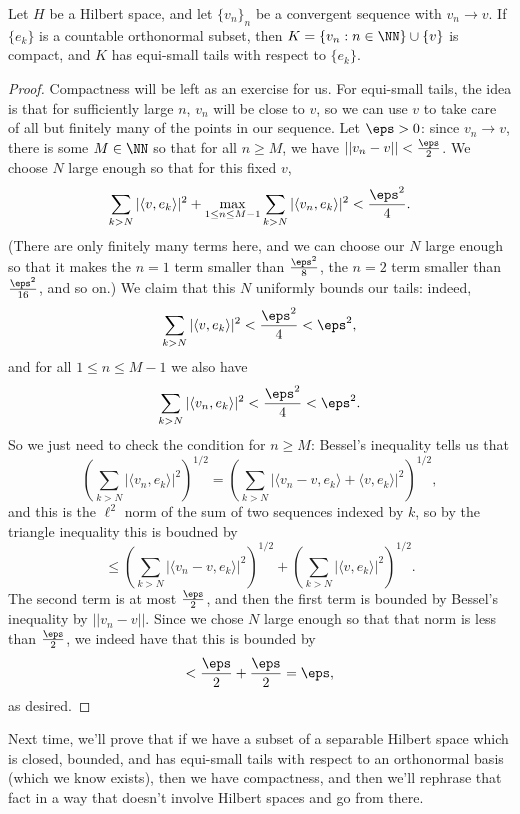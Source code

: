 \begin{theorem}
Let $H$ be a Hilbert space, and let $\{v_n\}_n$ be a convergent sequence with $v_n \to v$. If $\{e_k\}$ is a countable orthonormal subset, then $K = \{v_n: n \in \NN\} \cup \{v\}$ is compact, and $K$ has equi-small tails with respect to $\{e_k\}$.
\end{theorem}

\begin{proof}
Compactness will be left as an exercise for us. For equi-small tails, the idea is that for sufficiently large $n$, $v_n$ will be close to $v$, so we can use $v$ to take care of all but finitely many of the points in our sequence. Let $\eps > 0$: since $v_n \to v$, there is some $M \in \NN$ so that for all $n \ge M$, we have $||v_n - v|| < \frac{\eps}{2}$. We choose $N$ large enough so that for this fixed $v$,
\[
    \sum_{k > N} |\langle v, e_k \rangle|^2 + \max_{1 \le n \le M-1} \sum_{k > N}|\langle v_n, e_k \rangle|^2 < \frac{\eps^2}{4}.
\]
(There are only finitely many terms here, and we can choose our $N$ large enough so that it makes the $n = 1$ term smaller than $\frac{\eps^2}{8}$, the $n = 2$ term smaller than $\frac{\eps^2}{16}$, and so on.) We claim that this $N$ uniformly bounds our tails: indeed, 
\[
    \sum_{k > N} |\langle v, e_k \rangle|^2 < \frac{\eps^2}{4} < \eps^2,
\]
and for all $1 \le n \le M-1$ we also have
\[
    \sum_{k > N} |\langle v_n, e_k \rangle|^2 < \frac{\eps^2}{4} < \eps^2.
\]
So we just need to check the condition for $n \ge M$: Bessel's inequality tells us that
\[
    \left(\sum_{k > N} |\langle v_n, e_k \rangle|^2 \right)^{1/2} = \left(\sum_{k > N} |\langle v_n - v, e_k \rangle + \langle v, e_k \rangle|^2 \right)^{1/2},
\]
and this is the $\ell^2$ norm of the sum of two sequences indexed by $k$, so by the triangle inequality this is boudned by 
\[
    \le \left(\sum_{k>N}|\langle v_n - v, e_k \rangle |^2\right)^{1/2} + \left(\sum_{k>N}|\langle v, e_k \rangle |^2\right)^{1/2}.
\]
The second term is at most $\frac{\eps}{2}$, and then the first term is bounded by Bessel's inequality by $||v_n - v||$. Since we chose $N$ large enough so that that norm is less than $\frac{\eps}{2}$, we indeed have that this is bounded by 
\[
    < \frac{\eps}{2} + \frac{\eps}{2} = \eps,
\]
as desired.
\end{proof}

Next time, we'll prove that if we have a subset of a separable Hilbert space which is closed, bounded, and has equi-small tails with respect to an orthonormal basis (which we know exists), then we have compactness, and then we'll rephrase that fact in a way that doesn't involve Hilbert spaces and go from there.

